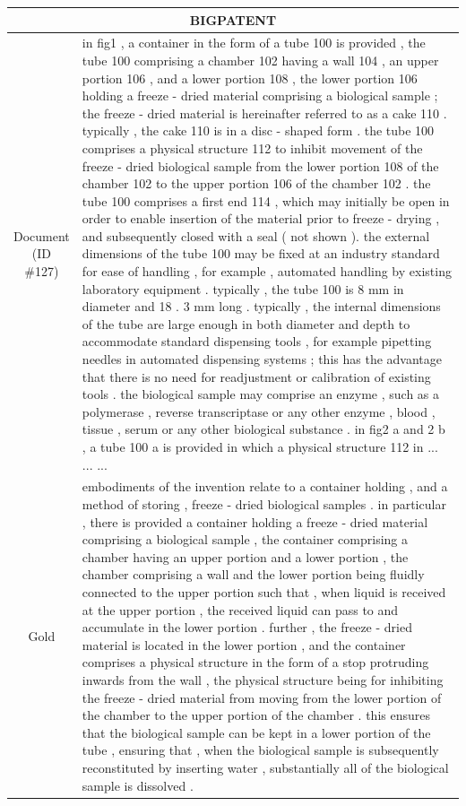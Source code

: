 \begin{table}[bth!]
\scriptsize
\centering
\renewcommand{\arraystretch}{1.3}
\begin{tabular}{c|p{}}
\hline
\multicolumn{2}{c}{BIGPATENT} \\ \hline
\makecell{Document\\(ID \#127)} & 
in fig1 , a container in the form of a tube 100 is provided , the tube 100 comprising a chamber 102 having a wall 104 , an upper portion 106 , and a lower portion 108 , the lower portion 106 holding a freeze - dried material comprising a biological sample ; the freeze - dried material is hereinafter referred to as a cake 110 . typically , the cake 110 is in a disc - shaped form . the tube 100 comprises a physical structure 112 to inhibit movement of the freeze - dried biological sample from the lower portion 108 of the chamber 102 to the upper portion 106 of the chamber 102 . the tube 100 comprises a first end 114 , which may initially be open in order to enable insertion of the material prior to freeze - drying , and subsequently closed with a seal ( not shown ). the external dimensions of the tube 100 may be fixed at an industry standard for ease of handling , for example , automated handling by existing laboratory equipment . typically , the tube 100 is 8 mm in diameter and 18 . 3 mm long . typically , the internal dimensions of the tube are large enough in both diameter and depth to accommodate standard dispensing tools , for example pipetting needles in automated dispensing systems ; this has the advantage that there is no need for readjustment or calibration of existing tools . the biological sample may comprise an enzyme , such as a polymerase , reverse transcriptase or any other enzyme , blood , tissue , serum or any other biological substance . in fig2 a and 2 b , a tube 100 a is provided in which a physical structure 112 in ... ... ... 
\\ \hline
Gold & 
embodiments of the invention relate to a container holding , and a method of storing , freeze - dried biological samples . in particular , there is provided a container holding a freeze - dried material comprising a biological sample , the container comprising a chamber having an upper portion and a lower portion , the chamber comprising a wall and the lower portion being fluidly connected to the upper portion such that , when liquid is received at the upper portion , the received liquid can pass to and accumulate in the lower portion . further , the freeze - dried material is located in the lower portion , and the container comprises a physical structure in the form of a stop protruding inwards from the wall , the physical structure being for inhibiting the freeze - dried material from moving from the lower portion of the chamber to the upper portion of the chamber . this ensures that the biological sample can be kept in a lower portion of the tube , ensuring that , when the biological sample is subsequently reconstituted by inserting water , substantially all of the biological sample is dissolved .

\end{tabular}
\end{table}
